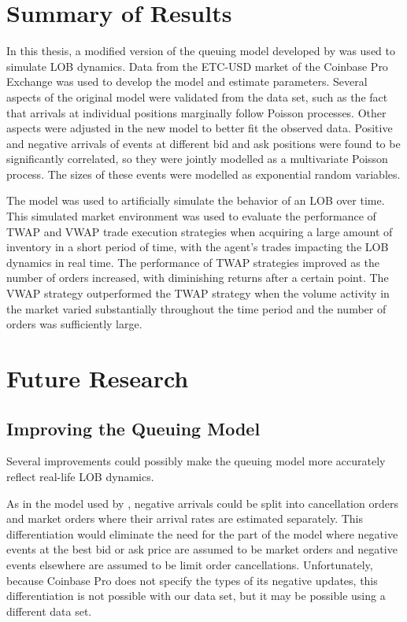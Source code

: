 \section{Summary of Results}
In this thesis, a modified version of the queuing model developed by \cite{A6} was used to simulate LOB dynamics. Data from the ETC-USD market of the Coinbase Pro Exchange was used to develop the model and estimate parameters. Several aspects of the original model were validated from the data set, such as the fact that arrivals at individual positions marginally follow Poisson processes. Other aspects were adjusted in the new model to better fit the observed data. Positive and negative arrivals of events at different bid and ask positions were found to be significantly correlated, so they were jointly modelled as a multivariate Poisson process. The sizes of these events were modelled as exponential random variables. 

The model was used to artificially simulate the behavior of an LOB over time. This simulated market environment was used to evaluate the performance of TWAP and VWAP trade execution strategies when acquiring a large amount of inventory in a short period of time, with the agent's trades impacting the LOB dynamics in real time. The performance of TWAP strategies improved as the number of orders increased, with diminishing returns after a certain point. The VWAP strategy outperformed the TWAP strategy when the volume activity in the market varied substantially throughout the time period and the number of orders was sufficiently large.

\section{Future Research}
\subsection{Improving the Queuing Model}
Several improvements could possibly make the queuing model more accurately reflect real-life LOB dynamics. 

As in the model used by \cite{A6}, negative arrivals could be split into cancellation orders and market orders where their arrival rates are estimated separately. This differentiation would eliminate the need for the part of the model where negative events at the best bid or ask price are assumed to be market orders and negative events elsewhere are assumed to be limit order cancellations. Unfortunately, because Coinbase Pro does not specify the types of its negative updates, this differentiation is not possible with our data set, but it may be possible using a different data set.

